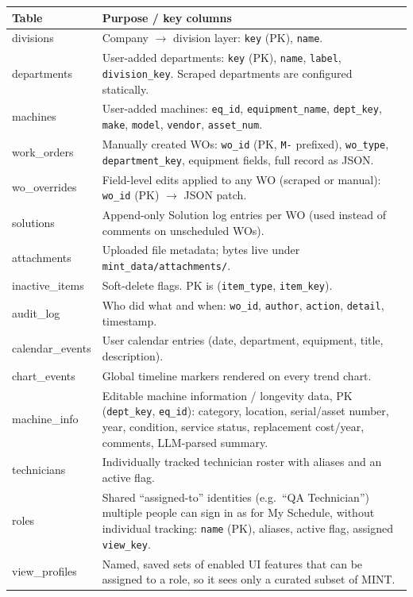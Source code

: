 \documentclass[11pt,a4paper]{article}
\newcommand{\code}[1]{\texttt{#1}}
\begin{document}
\begin{longtable}{@{}>{\ttfamily}p{}p{}@{}}
\toprule
\textbf{Table} & \textbf{Purpose / key columns} \\
\midrule
\endhead
divisions & Company $\rightarrow$ division layer: \code{key} (PK), \code{name}. \\
departments & User-added departments: \code{key} (PK), \code{name}, \code{label}, \code{division\_key}. Scraped departments are configured statically. \\
machines & User-added machines: \code{eq\_id}, \code{equipment\_name}, \code{dept\_key}, \code{make}, \code{model}, \code{vendor}, \code{asset\_num}. \\
work\_orders & Manually created WOs: \code{wo\_id} (PK, \code{M-} prefixed), \code{wo\_type}, \code{department\_key}, equipment fields, full record as JSON. \\
wo\_overrides & Field-level edits applied to any WO (scraped or manual): \code{wo\_id} (PK) $\rightarrow$ JSON patch. \\
solutions & Append-only Solution log entries per WO (used instead of comments on unscheduled WOs). \\
attachments & Uploaded file metadata; bytes live under \code{mint\_data/attachments/}. \\
inactive\_items & Soft-delete flags. PK is (\code{item\_type}, \code{item\_key}). \\
audit\_log & Who did what and when: \code{wo\_id}, \code{author}, \code{action}, \code{detail}, timestamp. \\
calendar\_events & User calendar entries (date, department, equipment, title, description). \\
chart\_events & Global timeline markers rendered on every trend chart. \\
machine\_info & Editable machine information / longevity data, PK (\code{dept\_key}, \code{eq\_id}): category, location, serial/asset number, year, condition, service status, replacement cost/year, comments, LLM-parsed summary. \\
technicians & Individually tracked technician roster with aliases and an active flag. \\
roles & Shared ``assigned-to'' identities (e.g.\ ``QA Technician'') multiple people can sign in as for My Schedule, without individual tracking: \code{name} (PK), aliases, active flag, assigned \code{view\_key}. \\
view\_profiles & Named, saved sets of enabled UI features that can be assigned to a role, so it sees only a curated subset of MINT. \\

\end{longtable}
\end{document}
